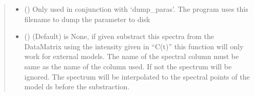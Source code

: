 \documentclass[letterpaper,10pt,english]{sphinxmanual}
\begin{document}
\begin{fulllineitems}
\begin{quote}
\begin{description}
\begin{itemize}
\item {} 
 (\sphinxstyleliteralemphasis{\sphinxupquote{, }}) \textendash{} Only used in conjunction with ‘dump\_paras’. The program uses this filename to dump the
parameter to disk

\item {} 
 (\sphinxstyleliteralemphasis{\sphinxupquote{, }}) \textendash{} (Default) is None, if given substract this spectra from the DataMatrix using the intensity
given in “C(t)” this function will only work for external models. The name of the spectral column
must be same as the name of the column used. If not the spectrum will be ignored. The spectrum will
be interpolated to the spectral points of the model ds before the substraction.

\end{itemize}

\end{description}\end{quote}

\end{fulllineitems}

\end{document}
